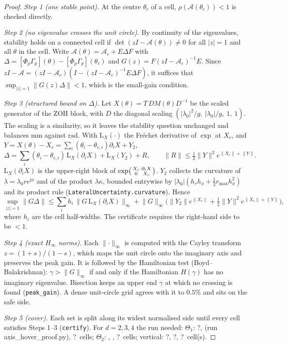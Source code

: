 \documentclass[11pt]{article}
\newcommand{\jj}{\mathrm{j}}
\newcommand{\norm}[1]{\lVert #1 \rVert}
\newcommand{\certLateralD}{(run axis\_hover\_proof.py)}\newcommand{\certLateralC}{?}%
\newcommand{\certLateralE}{?}\newcommand{\certVerticalC}{?}\newcommand{\certVerticalD}{?}%
\newcommand{\certVerticalE}{?}\newcommand{\regionLateralMm}{?}\newcommand{\regionHeightBandMm}{?}%
\newcommand{\certLeakE}{?}\newcommand{\evidenceRadius}{?}}
\begin{document}
\begin{proof}
\emph{Step 1 (one stable point).} At the centre $\theta_c$ of a cell, $\rho(\mathcal A(\theta_c))<1$
is checked directly.

\emph{Step 2 (no eigenvalue crosses the unit circle).} By continuity of the eigenvalues, stability
holds on a connected cell if $\det(zI-\mathcal A(\theta))\neq0$ for all $|z|=1$ and all $\theta$ in
the cell. Write $\mathcal A(\theta)=\mathcal A_c+E\Delta F$ with
$\Delta=[\Phi_p\Gamma_p](\theta)-[\Phi_p\Gamma_p](\theta_c)$ and
$G(z)=F(zI-\mathcal A_c)^{-1}E$. Since $zI-\mathcal A=(zI-\mathcal A_c)(I-(zI-\mathcal A_c)^{-1}E\Delta F)$,
it suffices that $\sup_{|z|=1}\norm{G(z)\Delta}<1$, which is the small-gain condition.

\emph{Step 3 (structured bound on $\Delta$).} Let $X(\theta)=T\,D M(\theta)D^{-1}$ be the scaled
generator of the ZOH block, with $D$ the diagonal scaling $(|\lambda_0|^2/g,\ |\lambda_0|/g,\ 1,\ 1)$.
The scaling is a similarity, so it leaves the stability question unchanged and balances
mm against rad. With $\mathrm{L}_X(\cdot)$ the Fréchet derivative of $\exp$ at $X_c$, and
$Y=X(\theta)-X_c=\sum_i(\theta_i-\theta_{c,i})\partial_iX+Y_2$,
\[
\Delta=\sum_i(\theta_i-\theta_{c,i})\,\mathrm{L}_X(\partial_iX)+\mathrm{L}_X(Y_2)+R,\qquad
\norm{R}\le\tfrac12\norm{Y}^2e^{\norm{X_c}+\norm Y}.
\]
$\mathrm{L}_X(\partial_iX)$ is the upper-right block of $\exp\begin{psmallmatrix}X_c&\partial_iX\\0&X_c\end{psmallmatrix}$.
$Y_2$ collects the curvature of $\lambda=\lambda_0 re^{\jj\phi}$ and of the product $\lambda\kappa$,
bounded entrywise by
$|\lambda_0|(h_rh_\phi+\tfrac12 r_{\max}h_\phi^2)$ and its product rule (\texttt{LateralUncertainty.curvature}).
Hence
\[
\sup_{|z|=1}\norm{G\Delta}\le\sum_i h_i\,\norm{G\,\mathrm{L}_X(\partial_iX)}_\infty
+\norm{G}_\infty\Big(\norm{Y_2}e^{\norm{X_c}}+\tfrac12\norm Y^2e^{\norm{X_c}+\norm Y}\Big),
\]
where $h_i$ are the cell half-widths. The certificate requires the right-hand side to be $<1$.

\emph{Step 4 (exact $H_\infty$ norms).} Each $\norm{\cdot}_\infty$ is computed with the Cayley transform
$z=(1+s)/(1-s)$, which maps the unit circle onto the imaginary axis and preserves the peak gain. It is
followed by the Hamiltonian test (Boyd--Balakrishnan): $\gamma>\norm{G}_\infty$ if and only if the
Hamiltonian $H(\gamma)$ has no imaginary eigenvalue. Bisection keeps an upper end $\gamma$ at which
no crossing is found (\texttt{peak\_gain}). A dense unit-circle grid agrees with it to $0.5\%$ and
sits on the safe side.

\emph{Step 5 (cover).} Each set is split along its widest normalised side until every cell satisfies
Steps 1--3 (\texttt{certify}). For $d=2,3,4$ the run needed:
$\Theta_1$: \certLateralC, \certLateralD, \certLateralE\ cells; $\Theta_2$: \certLeakC, \certLeakD,
\certLeakE\ cells; vertical: \certVerticalC, \certVerticalD, \certVerticalE\ cell(s).
\end{proof}
\end{document}
